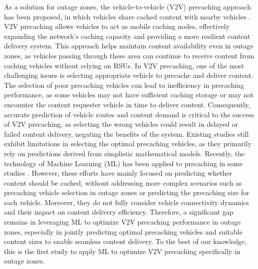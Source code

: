 \documentclass{aims}
\numberwithin{equation}{section}
\begin{document}
As a solution for outage zones, the vehicle-to-vehicle (V2V) precaching approach has been proposed, in which vehicles share cached content with nearby vehicles \cite{Wang2017, Guo2017}. V2V precaching allows vehicles to act as mobile caching nodes, effectively expanding the network’s caching capacity and providing a more resilient content delivery system. This approach helps maintain content availability even in outage zones, as vehicles passing through these area can continue to receive content from caching vehicles without relying on RSUs. In V2V precaching, one of the most challenging issues is selecting appropriate vehicle to precache and deliver content. The selection of poor precaching vehicles can lead to inefficiency in precaching performance, as some vehicles may not have sufficient caching storage or may not encounter the content requester vehicle in time to deliver content. Consequently, accurate prediction of vehicle routes and content demand is critical to the success of V2V precaching, as selecting the wrong vehicles could result in delayed or failed content delivery, negating the benefits of the system. Existing studies still exhibit limitations in selecting the optimal precaching vehicles, as they primarily rely on predictions derived from simplistic mathematical models. Recently, the technology of Machine Learning (ML) has been applied to precaching in some studies \cite{Zhang2024, Chen2024}. However, these efforts have mainly focused on predicting whether content should be cached, without addressing more complex scenarios such as precaching vehicle selection in outage zones or predicting the precaching size for each vehicle.
Moreover, they do not fully consider vehicle connectivity dynamics and their impact on content delivery efficiency. Therefore, a significant gap remains in leveraging ML to optimize V2V precaching performance in outage zones, especially in jointly predicting optimal precaching vehicles and suitable content sizes to enable seamless content delivery. To the best of our knowledge, this is the first study to apply ML to optimize V2V precaching specifically in outage zones.
\end{document}
